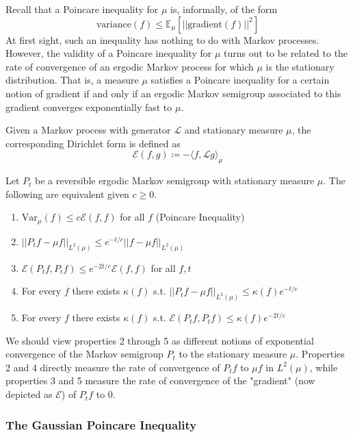\documentclass{article}
\begin{document}
Recall that a Poincare inequality for $\mu$ is, informally, of the form 
\[\mathrm{variance}(f) \leq \mathbb{E}_\mu[ ||\mathrm{gradient}(f)||^2 ]\]
At first sight, such an inequality has nothing to do with Markov processes. However, the validity of a Poincare inequality for $\mu$ turns out to be related to the rate of convergence of an ergodic Markov process for which $\mu$ is the stationary distribution. That is, a measure $\mu$ satisfies a Poincare inequality for a certain notion of gradient if and only if an ergodic Markov semigroup associated to this gradient converges exponentially fast to $\mu$. 

\begin{definition}
Given a Markov process with generator $\mathscr{L}$ and stationary measure $\mu$, the corresponding Dirichlet form is defined as 
\[\mathcal{E}(f, g) \coloneqq - \langle f, \mathscr{L} g \rangle_\mu\]
\end{definition}

\begin{theorem}
Let $P_t$ be a reversible ergodic Markov semigroup with stationary measure $\mu$. The following are equivalent given $c \geq 0$. 
\begin{enumerate}
    \item $\mathrm{Var}_\mu (f) \leq c \mathcal{E}(f, f)$ for all $f$ (Poincare Inequality) 
    \item $||P_t f - \mu f||_{L^2 (\mu)} \leq e^{-t /c} ||f - \mu f||_{L^2 (\mu)}$
    \item $\mathcal{E}(P_t f, P_t f) \leq e^{-2t /c} \mathcal{E}(f, f)$ for all $f, t$
    \item For every $f$ there exists $\kappa (f)$ s.t. $||P_t f - \mu f||_{L^2 (\mu)} \leq \kappa(f) e^{-t/c}$
    \item For every $f$ there exists $\kappa (f)$ s.t. $\mathcal{E}(P_t f, P_t f) \leq \kappa(f) e^{-2t/c}$ 
\end{enumerate}
\end{theorem}

We should view properties 2 through 5 as different notions of exponential convergence of the Markov semigroup $P_t$ to the stationary measure $\mu$. Properties 2 and 4 directly measure the rate of convergence of $P_t f$ to $\mu f$ in $L^2 (\mu)$, while properties 3 and 5 measure the rate of convergence of the "gradient" (now depicted as $\mathcal{E}$) of $P_t f$ to $0$. 

\subsubsection{The Gaussian Poincare Inequality}
\end{document}
